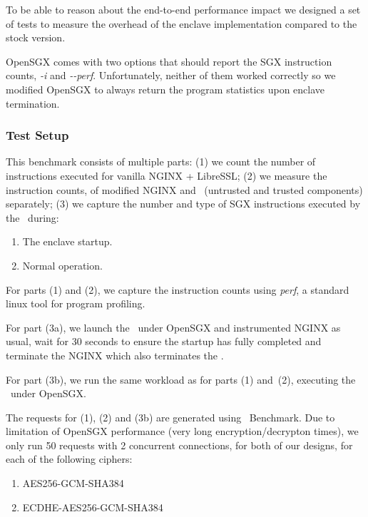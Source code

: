\documentclass[../../../main.tex]{subfiles}
\begin{document}
\label{sec:cpu-instr-analysis}
To be able to reason about the end-to-end performance impact we designed a set
of tests to measure the overhead of the enclave implementation compared to the
stock version.


OpenSGX comes with two options that should report the SGX instruction counts,
\textit{-i} and \textit{-{}-perf}. Unfortunately, neither of them worked
correctly so we modified OpenSGX to always return the program statistics upon
enclave termination.

\subsubsection*{Test Setup}
This benchmark consists of multiple parts: (1) we count the number of
instructions executed for vanilla NGINX + LibreSSL; (2) we measure the
instruction counts, of modified NGINX and \enclavemodel~(untrusted and trusted
components) separately; (3) we capture the number and type of SGX instructions
executed by the \enclaveprogram~during:
\begin{enumerate}[label=3\alph*)]
  \item The enclave startup.
  \item Normal operation.
\end{enumerate}

For parts (1) and (2), we capture the instruction counts using \textit{perf},
a standard linux tool for program profiling.

For part (3a), we launch the \enclaveprogram~under OpenSGX and instrumented
NGINX as usual, wait for 30 seconds to ensure the startup has fully completed
and terminate the NGINX which also terminates the \enclaveprogram.

For part (3b), we run the same workload as for parts (1) and~(2), executing
the \enclaveprogram~under OpenSGX.

The requests for (1), (2) and (3b) are generated using \Apache~Benchmark. Due
to limitation of OpenSGX performance (very long encryption/decrypton times),
we only run 50 requests with 2 concurrent connections, for both of our
designs, for each of the following ciphers:
\begin{enumerate}
  \item AES256-GCM-SHA384
  \item ECDHE-AES256-GCM-SHA384
\end{enumerate}
\end{document}
